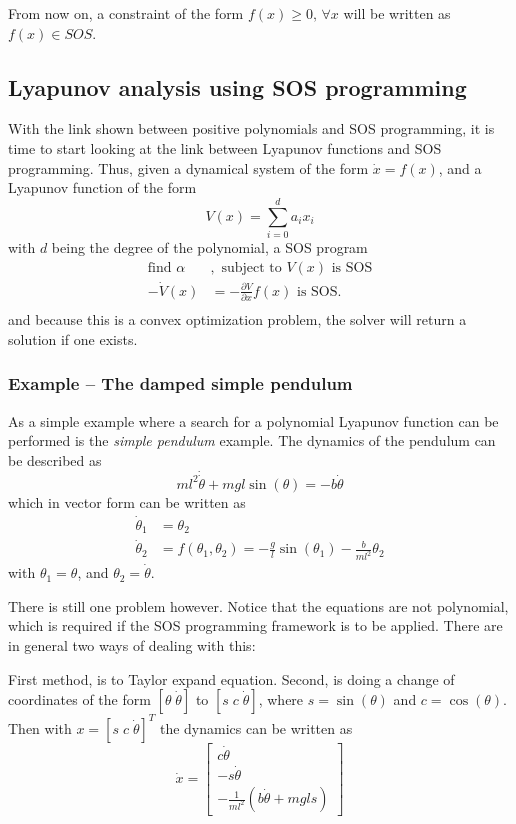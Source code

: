 From now on, a constraint of the form \(f(x) \geq 0,\, \forall x\) will be
written as \(f(x) \in SOS\).

\subsection{Lyapunov analysis using SOS programming}

With the link shown between positive polynomials and \ac{SOS} programming, it is
time to start looking at the link between Lyapunov functions and SOS
programming. Thus, given a dynamical system of the form \(\dot{x} = f(x)\), and
a Lyapunov function of the form
\[
  V(x) = \sum_{i=0}^{d} a_{i}x_{i}
\]
with \(d\) being the degree of the polynomial, a \ac{SOS} program
\begin{align*}
  \text{find \(\alpha\)}&, \text{ subject to } V(x) \text{ is SOS}\\
  -\dot{V}(x) &= -\frac{\partial V}{\partial x}f(x) \text{ is SOS}.\\
\end{align*}
\cite{tedrakeUnderactuatedRoboticsAlgorithms2019} and because this is a convex
optimization problem, the solver will return a solution if one exists.

\subsubsection{Example -- The damped simple pendulum}

As a simple example where a search for a polynomial Lyapunov function can be
performed is the \textit{simple pendulum} example. The dynamics of the pendulum
can be described as
\[
  ml^2\dot{\dot{\theta}} + mgl \sin(\theta) = -b\dot{\theta}
\]
which in vector form can be written as
\begin{align*}
  \dot{\theta}_1 &= \theta_2 \\
  \dot{\theta}_2 &= f(\theta_1,\theta_2) = -\frac{g}{l}\sin(\theta_1) -\frac{b}{ml^2}\theta_2
\end{align*}
with \(\theta_1 = \theta\), and \(\theta_2 = \dot{\theta}\).

There is still one problem however. Notice that the equations are not
polynomial, which is required if the \ac{SOS} programming framework is to be
applied. There are in general two ways of dealing with this:

First method, is to Taylor expand equation. Second, is doing a change of
coordinates of the form \(\left[ \theta \; \dot{\theta} \right] \) to \(\left[ s
  \;c \; \dot{\theta} \right]\), where \(s = \sin(\theta)\) and \(c =
\cos(\theta)\). Then with \(x = {\left[ s \; c \; \dot{\theta} \right]}^{T}\) the
dynamics can be written as
\[
  \dot{x} =
  \begin{bmatrix}
    c\dot{\theta} \\
    -s\dot{\theta} \\
    - \frac{1}{ml^2} \left( b\dot{\theta} + mgl s \right)
  \end{bmatrix}
\]

